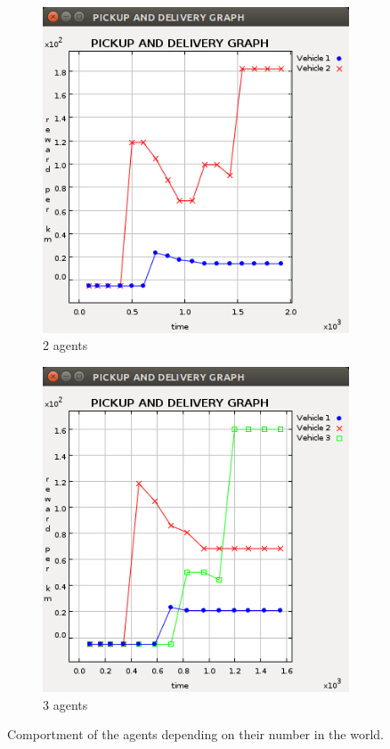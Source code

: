 \documentclass[11pt]{article}
\begin{document}
\begin{figure}
\begin{subfigure}[b]{0.3\textwidth}
    \includegraphics[width=\textwidth]{2agentsBFSASTAR.png}
    \caption{2 agents}
    \label{img:2agents}
  \end{subfigure}
  \begin{subfigure}[b]{0.3\textwidth}
    \includegraphics[width=\textwidth]{3agentsBBA.png}
    \caption{3 agents}
    \label{img:3agents}
  \end{subfigure}
  \caption{Comportment of the agents depending on their number in the world.}
  \label{img:multipleAgent}
\end{figure}
\end{document}
